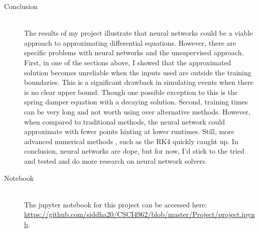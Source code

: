 \documentclass[12pt]{article}
\begin{document}
\begin{description}
    \item[Conclusion] \hfill \\ 
    The results of my project illustrate that neural networks could be a viable
    approach to approximating differential equations. However, there are
    specific problems with neural networks and the unsupervised approach.
    First, in one of the sections above, I showed that the approximated
    solution becomes unreliable when the inputs used are outside the training
    boundaries. This is a significant drawback in simulating events when there
    is no clear upper bound. Though one possible exception to this is the
    spring damper equation with a decaying solution. Second, training times can
    be very long and not worth using over alternative methods. However, when
    compared to traditional methods, the neural network could approximate with
    fewer points hinting at lower runtimes. Still, more advanced numerical
    methods , such as the RK4 quickly caught up. In conclusion, neural networks
    are dope, but for now, I'd stick to the tried and tested and do more
    research on neural network solvers. 

    \item[Notebook] \hfill \\
    The jupyter notebook for this project can be accessed here: \\
    \url{https://github.com/siddha20/CSCI4962/blob/master/Project/project.ipynb}.
\end{description}
\end{document}
